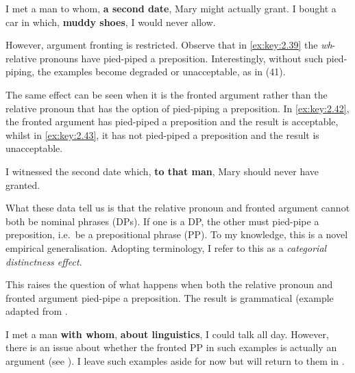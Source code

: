 \documentclass[output=paper]{langsci/langscibook}
\begin{document}
\ea\label{ex:key:2.39}
    \ea    I met a man to whom, \textbf{a second date}, Mary might actually grant.
    \ex    I bought a car in which, \textbf{muddy shoes}, I would never allow.
    \z
\z

\ea\label{ex:key:2.40}
    \z
\z
However, argument fronting is restricted. Observe that in \eqref{ex:key:2.39} the
\emph{wh}{-relative pronouns have pied-piped a preposition. Interestingly,
without such pied-piping, the examples become degraded or unacceptable, as in
(}41).

\ea\label{ex:key:2.41}
    \z
\z
The same effect can be seen when it is the fronted argument rather than the
relative pronoun that has the option of pied-piping a preposition. In \eqref{ex:key:2.42}, the
fronted argument has pied-piped a preposition and the result is acceptable,
whilst in \eqref{ex:key:2.43}, it has not pied-piped a preposition and the result is
unacceptable.

\ea\label{ex:key:2.42}
    I witnessed the second date which, \textbf{to that man}, Mary should never have granted.
\z

\label{ex:key:2.43}
\z
What these data tell us is that the relative pronoun and fronted argument
cannot both be nominal phrases (DPs). If one is a DP, the other must pied-pipe
a preposition, i.e.\ be a prepositional phrase (PP). To my knowledge, this is a
novel empirical generalisation. Adopting  terminology, I refer
to this as a \emph{categorial distinctness effect}.

This raises the question of what happens when both the relative pronoun and
fronted argument pied-pipe a preposition. The result is grammatical (example
adapted from \textcite{Totsuka2014}.

\ea\label{ex:key:2.44}
    I met a man \textbf{with whom}, \textbf{about linguistics}, I could talk all day.
\z
However, there is an issue about whether the fronted PP in such examples is
actually an argument (see \citealt[294, 322--325]{Rizzi1997}). I leave such
examples aside for now but will return to them in .
\end{document}
